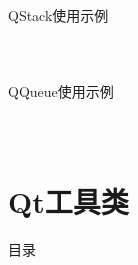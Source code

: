 \documentclass[UTF8,aspectratio=169]{beamer}
\begin{document}
\begin{frame}[fragile]{QStack使用示例}
    \begin{columns}
        \begin{column}{0.48\textwidth}
            \inputminted[firstline=1,lastline=16]{cpp}{code/qt_stack_example.cpp}
        \end{column}
        \begin{column}{0.48\textwidth}
            \inputminted[firstline=17,lastline=34]{cpp}{code/qt_stack_example.cpp}
        \end{column}
    \end{columns}
\end{frame}

\begin{frame}[fragile]{QQueue使用示例}
    \begin{columns}
        \begin{column}{0.48\textwidth}
            \inputminted[firstline=1,lastline=17]{cpp}{code/qt_queue_example.cpp}
        \end{column}
        \begin{column}{0.48\textwidth}
            \inputminted[firstline=18,lastline=34]{cpp}{code/qt_queue_example.cpp}
        \end{column}
    \end{columns}
\end{frame}

\section{Qt工具类}
\begin{frame}{目录}
    \begin{multicols}{2}
        \tableofcontents[currentsection]
    \end{multicols}
\end{frame}
\end{document}

